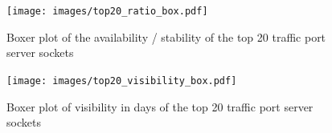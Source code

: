 \begin{landscape}
	\begin{figure}
	[p] \centering 
	\texttt{[image: images/top20\_ratio\_box.pdf]}
	\caption{Boxer plot of the availability / stability of the top 20 traffic port server sockets} 
	\label{fig:top20_ratio_box} 
\end{figure}
\end{landscape}

\begin{landscape}
\begin{figure}
	[p] \centering 
	\texttt{[image: images/top20\_visibility\_box.pdf]}
	\caption{Boxer plot of visibility in days of the top 20 traffic port server sockets}
	\label{fig:top20_visibledays_box}
\end{figure}
\end{landscape}



